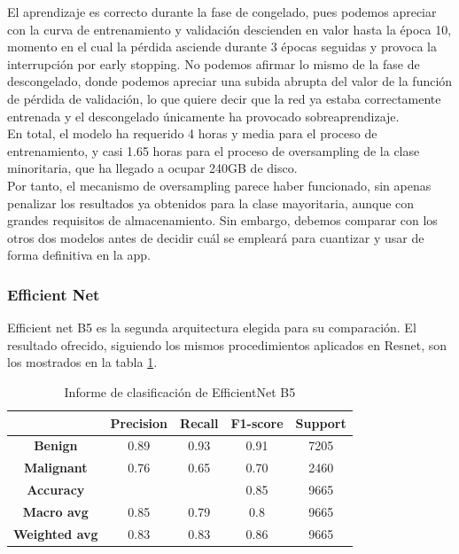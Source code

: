 El aprendizaje es correcto durante la fase de congelado, pues podemos apreciar con la curva de entrenamiento y validación descienden en valor hasta la época 10, momento en el cual la pérdida asciende durante 3 épocas seguidas y provoca la interrupción por early stopping. No podemos afirmar lo mismo de la fase de descongelado, donde podemos apreciar una subida abrupta del valor de la función de pérdida de validación, lo que quiere decir que la red ya estaba correctamente entrenada y el descongelado únicamente ha provocado sobreaprendizaje.\\

En total, el modelo ha requerido 4 horas y media para el proceso de entrenamiento, y casi 1.65 horas para el proceso de oversampling de la clase minoritaria, que ha llegado a ocupar 240GB de disco.\\

Por tanto, el mecanismo de oversampling parece haber funcionado, sin apenas penalizar los resultados ya obtenidos para la clase mayoritaria, aunque con grandes requisitos de almacenamiento. Sin embargo, debemos comparar con los otros dos modelos antes de decidir cuál se empleará para cuantizar y usar de forma definitiva en la app.

\subsubsection{Efficient Net}

Efficient net B5 es la segunda arquitectura elegida para su comparación. El resultado ofrecido, siguiendo los mismos procedimientos aplicados en Resnet, son los mostrados en la tabla \ref{tab:resefnet}.

\begin{table}[H]
	\centering
	\begin{tabular}{|c|c|c|c|c|}
		\hline
		\textbf{} & \textbf{Precision} & \textbf{Recall} & \textbf{F1-score} & \textbf{Support} \\ \hline
		\textbf{Benign} & 0.89 & 0.93 & 0.91 & 7205 \\ \hline
		\textbf{Malignant} & 0.76 & 0.65 & 0.70 & 2460 \\ \hline
		\textbf{Accuracy} &  &  & 0.85 & 9665 \\ \hline
		\textbf{Macro avg} & 0.85 & 0.79 & 0.8 & 9665 \\ \hline
		\textbf{Weighted avg} & 0.83 & 0.83 & 0.86 & 9665 \\ \hline
	\end{tabular}
	\caption{Informe de clasificación de EfficientNet B5}
	\label{tab:resefnet}
\end{table}

